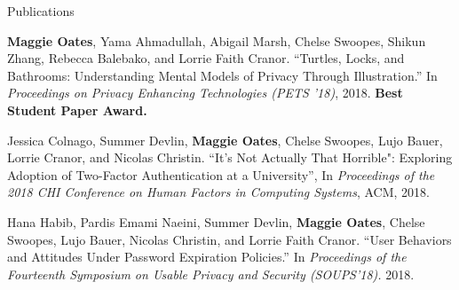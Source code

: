 \documentclass{resume} %
\begin{document}
\begin{rSection}{Publications}
\item \textbf{Maggie Oates}, Yama Ahmadullah, Abigail Marsh, Chelse Swoopes, Shikun Zhang, Rebecca Balebako, and Lorrie Faith Cranor. ``Turtles, Locks, and Bathrooms: Understanding Mental Models of Privacy Through Illustration.''
	In \textit{Proceedings on Privacy Enhancing Technologies (PETS '18)}, 2018. \textbf{Best Student Paper Award.}
	\item Jessica Colnago, Summer Devlin, \textbf{Maggie Oates}, Chelse Swoopes, Lujo Bauer, Lorrie Cranor, and Nicolas Christin. 
		``It's Not Actually That Horrible": Exploring Adoption of Two-Factor Authentication at a University'', In \textit{Proceedings of the 2018 CHI Conference on Human Factors in Computing Systems}, ACM, 2018.
	\item Hana Habib, Pardis Emami Naeini, Summer Devlin, \textbf{Maggie Oates}, Chelse Swoopes, Lujo Bauer, Nicolas Christin, and Lorrie Faith Cranor. ``User Behaviors and Attitudes Under Password Expiration Policies.''
		In \textit{Proceedings of the Fourteenth Symposium on Usable Privacy and Security (SOUPS'18).} 2018.
\end{rSection}
\end{document}
